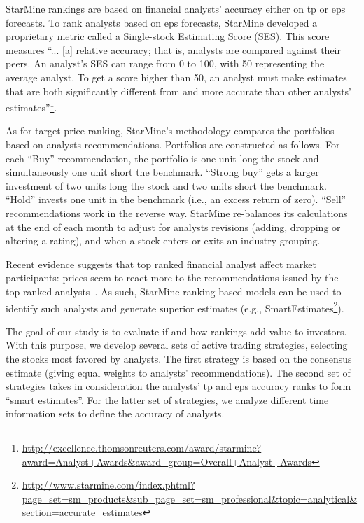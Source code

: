 \documentclass[a4paper,twoside,12pt,openright,notitlepage]{report}\usepackage[]{graphicx}\usepackage[]{color}
\begin{document}
StarMine rankings are based on financial analysts' accuracy either on \gls{tp} or \gls{eps} forecasts. To rank analysts based on \gls{eps} forecasts, StarMine developed a proprietary metric called a Single-stock Estimating Score (SES). This score measures ``... [a] relative accuracy; that is, analysts are compared against their peers. An analyst's SES can range from 0 to 100, with 50 representing the average analyst. To get a score higher than 50, an analyst must make estimates that are both significantly different from and more accurate than other analysts' estimates''\footnote{\url{http://excellence.thomsonreuters.com/award/starmine?award=Analyst+Awards&award_group=Overall+Analyst+Awards}}.


As for target price ranking, StarMine's methodology compares the portfolios based on analysts recommendations. Portfolios are constructed as follows. For each ``Buy'' recommendation, the portfolio is one unit long the stock and simultaneously one unit short the benchmark. ``Strong buy'' gets a larger investment of two units long the stock and two units short the benchmark. ``Hold'' invests one unit in the benchmark (i.e., an excess return of zero). ``Sell'' recommendations work in the reverse way. StarMine re-balances its calculations at the end of each month to adjust for analysts revisions (adding, dropping or altering a rating), and when a stock enters or exits an industry grouping.


Recent evidence suggests that top ranked financial analyst affect market participants: prices seem to react more to the recommendations issued by the top-ranked analysts~\citep{emery2009}. As such, StarMine ranking based models can be used to identify such analysts and generate superior estimates (e.g., SmartEstimates\footnote{\url{http://www.starmine.com/index.phtml?page_set=sm_products&sub_page_set=sm_professional&topic=analytical&section=accurate_estimates}}).



The goal of our study is to evaluate if and how rankings  add value to investors.  With this purpose, we develop several sets of active trading strategies, selecting the stocks most favored by analysts. The first strategy is based on the consensus estimate (giving equal weights to analysts' recommendations). The second set of strategies takes in consideration the analysts' \gls{tp} and \gls{eps} accuracy ranks to form ``smart estimates''. For the latter set of strategies, we analyze different time information sets to define the accuracy of analysts.
\end{document}
